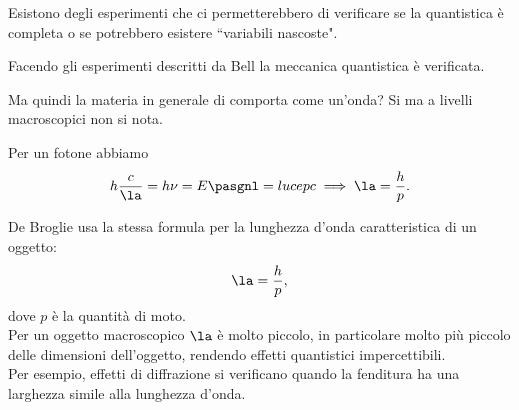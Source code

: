 \begin{theorem}[Bell]
Esistono degli esperimenti che ci permetterebbero di verificare se la quantistica \`e completa o se potrebbero esistere ``variabili nascoste". 
\end{theorem}
\begin{fact}
Facendo gli esperimenti descritti da Bell la meccanica quantistica \`e verificata.
\end{fact}


\noindent
Ma quindi la materia in generale di comporta come un'onda? Si ma a livelli macroscopici non si nota. 

\begin{remark}
Per un fotone abbiamo
\[h\frac c\la=h\nu=E\pasgnl={luce}pc\implies \la=\frac hp.\]
\end{remark}

\noindent
De Broglie usa la stessa formula per la lunghezza d'onda caratteristica di un oggetto:
\[\la=\frac hp,\]
dove $p$ \`e la quantit\`a di moto.\\
Per un oggetto macroscopico $\la$ \`e molto piccolo, in particolare molto pi\`u piccolo delle dimensioni dell'oggetto, rendendo effetti quantistici impercettibili.\\
Per esempio, effetti di diffrazione si verificano quando la fenditura ha una larghezza simile alla lunghezza d'onda.